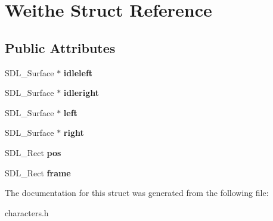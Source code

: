 \hypertarget{structWeithe}{}\section{Weithe Struct Reference}
\label{structWeithe}
\subsection*{Public Attributes}
\begin{DoxyCompactItemize}
\item 
S\+D\+L\+\_\+\+Surface $\ast$ {\bfseries idleleft}\hypertarget{structWeithe_a8ddfa97989d1f7285f06878545cf41c6}{}\label{structWeithe_a8ddfa97989d1f7285f06878545cf41c6}

\item 
S\+D\+L\+\_\+\+Surface $\ast$ {\bfseries idleright}\hypertarget{structWeithe_a2d0377e1e926ec30b3b4fec8709f2a87}{}\label{structWeithe_a2d0377e1e926ec30b3b4fec8709f2a87}

\item 
S\+D\+L\+\_\+\+Surface $\ast$ {\bfseries left}\hypertarget{structWeithe_a0cc73a92b0002ba6630371d063c8ad22}{}\label{structWeithe_a0cc73a92b0002ba6630371d063c8ad22}

\item 
S\+D\+L\+\_\+\+Surface $\ast$ {\bfseries right}\hypertarget{structWeithe_a4eef01ad5bc6c996fa18eec817cfedc3}{}\label{structWeithe_a4eef01ad5bc6c996fa18eec817cfedc3}

\item 
S\+D\+L\+\_\+\+Rect {\bfseries pos}\hypertarget{structWeithe_a685e4205662bc68d568dc65072b76d28}{}\label{structWeithe_a685e4205662bc68d568dc65072b76d28}

\item 
S\+D\+L\+\_\+\+Rect {\bfseries frame}\hypertarget{structWeithe_aa4f3bffc7272272e2631468b23cdb3b3}{}\label{structWeithe_aa4f3bffc7272272e2631468b23cdb3b3}

\end{DoxyCompactItemize}


The documentation for this struct was generated from the following file\+:\begin{DoxyCompactItemize}
\item 
characters.\+h\end{DoxyCompactItemize}
